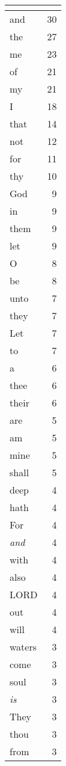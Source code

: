 \begin{center}
\begin{longtable}{l|r}
\hline \multicolumn{2}{c}{{ }} \\ \hline
\endfoot 
and & 30\\ \hline 
the & 27\\ \hline 
me & 23\\ \hline 
of & 21\\ \hline 
my & 21\\ \hline 
I & 18\\ \hline 
that & 14\\ \hline 
not & 12\\ \hline 
for & 11\\ \hline 
thy & 10\\ \hline 
God & 9\\ \hline 
in & 9\\ \hline 
them & 9\\ \hline 
let & 9\\ \hline 
O & 8\\ \hline 
be & 8\\ \hline 
unto & 7\\ \hline 
they & 7\\ \hline 
Let & 7\\ \hline 
to & 7\\ \hline 
a & 6\\ \hline 
thee & 6\\ \hline 
their & 6\\ \hline 
are & 5\\ \hline 
am & 5\\ \hline 
mine & 5\\ \hline 
shall & 5\\ \hline 
deep & 4\\ \hline 
hath & 4\\ \hline 
For & 4\\ \hline 
\emph{and} & 4\\ \hline 
with & 4\\ \hline 
also & 4\\ \hline 
LORD & 4\\ \hline 
out & 4\\ \hline 
will & 4\\ \hline 
waters & 3\\ \hline 
come & 3\\ \hline 
soul & 3\\ \hline 
\emph{is} & 3\\ \hline 
They & 3\\ \hline 
thou & 3\\ \hline 
from & 3\\ \hline 

\end{longtable}
\end{center}
